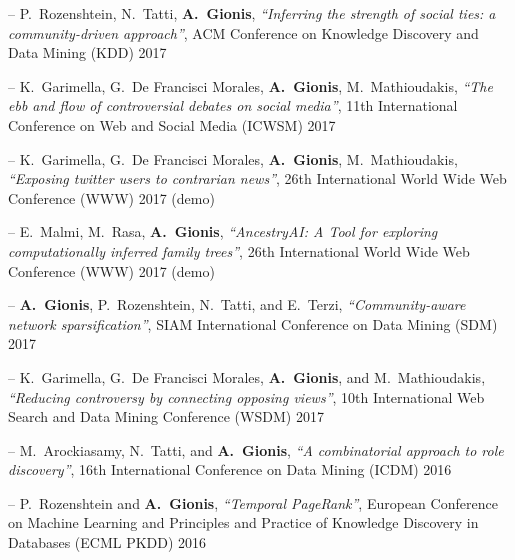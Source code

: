 \documentclass[a4paper,11pt]{article}
\begin{document}

\item[--] 
{P.\ Rozenshtein, N.\ Tatti, \textbf{A.\ Gionis}}, 
{\em ``Inferring the strength of social ties: a community-driven approach''}, 
ACM Conference on Knowledge Discovery and Data Mining (KDD) 2017

\item[--] 
{K.\ Garimella, G.\ De Francisci Morales, \textbf{A.\ Gionis}, M.\ Mathioudakis},
{\em ``The ebb and flow of controversial debates on social media''}, 
11th International Conference on Web and Social Media (ICWSM) 2017

\item[--] 
{K.\ Garimella, G.\ De Francisci Morales, \textbf{A.\ Gionis}, M.\ Mathioudakis},
{\em ``Exposing twitter users to contrarian news''}, 
26th International World Wide Web Conference (WWW) 2017 (demo) 

\item[--] 
{E.\ Malmi, M.\ Rasa, \textbf{A.\ Gionis}},
{\em ``AncestryAI: A Tool for exploring computationally inferred family trees''},
26th International World Wide Web Conference (WWW) 2017 (demo)

\item[--] 
{\textbf{A.\ Gionis}, P.\ Rozenshtein, N.\ Tatti, and E.\ Terzi},
{\em ``Community-aware network sparsification''}, 
SIAM International Conference on Data Mining (SDM) 2017

\item[--] 
{K.\ Garimella, G.\ De Francisci Morales, \textbf{A.\ Gionis}, and M.\ Mathioudakis},
{\em ``Reducing controversy by connecting opposing views''}, 
10th International Web Search and Data Mining Conference (WSDM) 2017

\item[--] 
{M.\ Arockiasamy, N.\ Tatti, and \textbf{A.\ Gionis}},
{\em ``A combinatorial approach to role discovery''}, 
16th International Conference on Data Mining (ICDM) 2016

\item[--] 
{P.\ Rozenshtein and \textbf{A.\ Gionis}},
{\em ``Temporal PageRank''}, 
European Conference on Machine Learning and Principles and Practice of Knowledge Discovery in Databases (ECML PKDD) 2016
\end{document}
